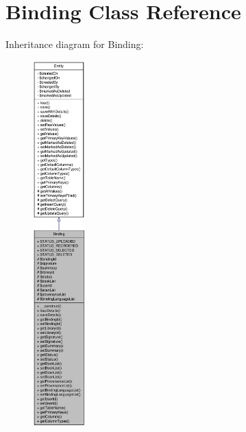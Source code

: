 \hypertarget{classBinding}{
\section{Binding Class Reference}
\label{classBinding}
}


Inheritance diagram for Binding:\nopagebreak
\begin{figure}[H]
\begin{center}
\leavevmode
\includegraphics[height=400pt]{classBinding__inherit__graph}
\end{center}
\end{figure}


